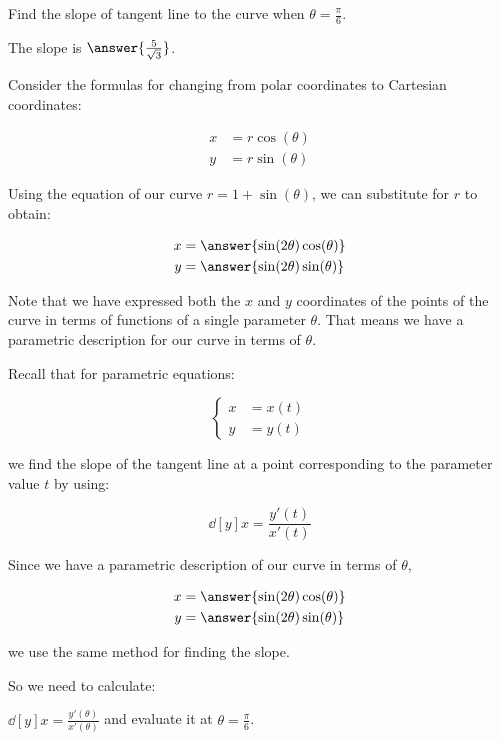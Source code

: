 \documentclass{ximera}
\begin{document}
\begin{exercise}
\begin{hint}
\end{hint}

\begin{exercise}

Find the slope of tangent line to the curve when $\theta=\frac{\pi}{6}$. 

The slope is $\answer{ \frac{5}{\sqrt{3}} }$.

\begin{hint}

Consider the formulas for changing from polar coordinates to Cartesian coordinates:

\begin{align*}
x&=r\cos(\theta) \\
y&=r\sin(\theta)
\end{align*}

Using the equation of our curve $r=1+\sin(\theta)$, we can substitute for $r$ to obtain:

\begin{align*}
x&=\answer{\sin(2\theta)\cos(\theta)} \\
y&=\answer{\sin(2\theta)\sin(\theta) }
\end{align*}

Note that we have expressed both the $x$ and $y$ coordinates of the points of the curve in terms of functions of a single parameter $\theta$. That means we have a parametric description for our curve in terms of $\theta$. 

Recall that for parametric equations: 

\[
\begin{cases}
x&=x(t) \\
y&=y(t)
\end{cases}
\]

we find the slope of the tangent line at a point corresponding to the parameter value $t$ by using: 

\[
\dd[y]{x}=\frac{ y'(t)}{x'(t)}
\]

Since we have a parametric description of our curve in terms of $\theta$, 

\begin{align*}
x&=\answer{\sin(2\theta)\cos(\theta)} \\
y&=\answer{\sin(2\theta)\sin(\theta) }
\end{align*}

we use the same method for finding the slope. 

So we need to calculate:

$\dd[y]{x}=\frac{ y'(\theta)}{x'(\theta)}$ and evaluate it at $\theta=\frac{\pi}{6}$. 


\end{hint}
\end{exercise}
\end{exercise}
\end{document}
